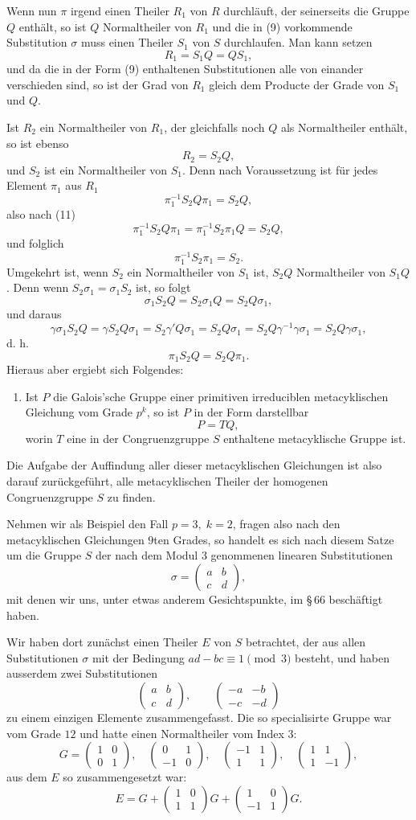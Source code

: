 \documentclass[11pt]{article}
\providecommand{\mat}[4]{\begin{pmatrix}#1&#2\\#3&#4\end{pmatrix}}
\providecommand{\mat}[4]{\begin{pmatrix}#1&#2\\#3&#4\end{pmatrix}}
\providecommand{\mat}[1]{\begin{pmatrix}#1\end{pmatrix}}
\begin{document}
Wenn nun $\pi$ irgend einen Theiler $R_1$ von $R$ durchläuft, der seinerseits die Gruppe $Q$ enthält, so ist $Q$ Normaltheiler von $R_1$ und die in (9) vorkommende Substitution $\sigma$ muss einen Theiler $S_1$ von $S$ durchlaufen. Man kann setzen
\[
 R_1=S_1Q=QS_1,
\]
und da die in der Form (9) enthaltenen Substitutionen alle von einander verschieden sind, so ist der Grad von $R_1$ gleich dem Producte der Grade von $S_1$ und $Q$.

Ist $R_2$ ein Normaltheiler von $R_1$, der gleichfalls noch $Q$ als Normaltheiler enthält, so ist ebenso
\[
 R_2=S_2Q,
\]
und $S_2$ ist ein Normaltheiler von $S_1$. Denn nach Voraussetzung ist für jedes Element $\pi_1$ aus $R_1$
\[
 \pi_1^{-1}S_2Q\pi_1=S_2Q,
\]
also nach (11)
\[
 \pi_1^{-1}S_2Q\pi_1
 =\pi_1^{-1}S_2\pi_1 Q=S_2Q,
\]
und folglich
\[
 \pi_1^{-1}S_2\pi_1=S_2.
\]
Umgekehrt ist, wenn $S_2$ ein Normaltheiler von $S_1$ ist, $S_2Q$ Normaltheiler von $S_1Q$. Denn wenn $S_2\sigma_1=\sigma_1S_2$ ist, so folgt
\[
 \sigma_1S_2Q=S_2\sigma_1Q=S_2Q\sigma_1,
\]
und daraus
\[
 \gamma\sigma_1S_2Q=\gamma S_2Q\sigma_1=S_2\gamma'Q\sigma_1
 =S_2Q\sigma_1=S_2Q\gamma^{-1}\gamma\sigma_1=S_2Q\gamma\sigma_1,
\]
d. h.
\[
 \pi_1S_2Q=S_2Q\pi_1.
\]
Hieraus aber ergiebt sich Folgendes:

\begin{enumerate}[label=\Roman*.,leftmargin=2.8em,start=2]
\item Ist $P$ die Galois'sche Gruppe einer primitiven irreduciblen metacyklischen Gleichung vom Grade $p^k$, so ist $P$ in der Form darstellbar
\[
 P=TQ,
\]
worin $T$ eine in der Congruenzgruppe $S$ enthaltene metacyklische Gruppe ist.
\end{enumerate}

Die Aufgabe der Auffindung aller dieser metacyklischen Gleichungen ist also darauf zurückgeführt, alle metacyklischen Theiler der homogenen Congruenzgruppe $S$ zu finden.

Nehmen wir als Beispiel den Fall $p=3,\;k=2$, fragen also nach den metacyklischen Gleichungen $9$ten Grades, so handelt es sich nach diesem Satze um die Gruppe $S$ der nach dem Modul $3$ genommenen linearen Substitutionen
\begin{equation}
 \sigma=\mat{a}{b}{c}{d},
 \tag{12}
\end{equation}
mit denen wir uns, unter etwas anderem Gesichtspunkte, im \S\,66 beschäftigt haben.

Wir haben dort zunächst einen Theiler $E$ von $S$ betrachtet, der aus allen Substitutionen $\sigma$ mit der Bedingung $ad-bc\equiv 1\pmod 3$ besteht, und haben ausserdem zwei Substitutionen
\begin{equation}
 \mat{a}{b}{c}{d},\qquad
 \mat{-a}{-b}{-c}{-d}
 \tag{13}
\end{equation}
zu einem einzigen Elemente zusammengefasst. Die so specialisirte Gruppe war vom Grade $12$ und hatte einen Normaltheiler vom Index $3$:
\[
 G=
 \mat{1}{0}{0}{1},\quad
 \mat{0}{1}{-1}{0},\quad
 \mat{-1}{1}{1}{1},\quad
 \mat{1}{1}{1}{-1},
\]
aus dem $E$ so zusammengesetzt war:
\[
 E=G+\mat{1}{0}{1}{1}G+\mat{1}{0}{-1}{1}G .
\]
\end{document}
